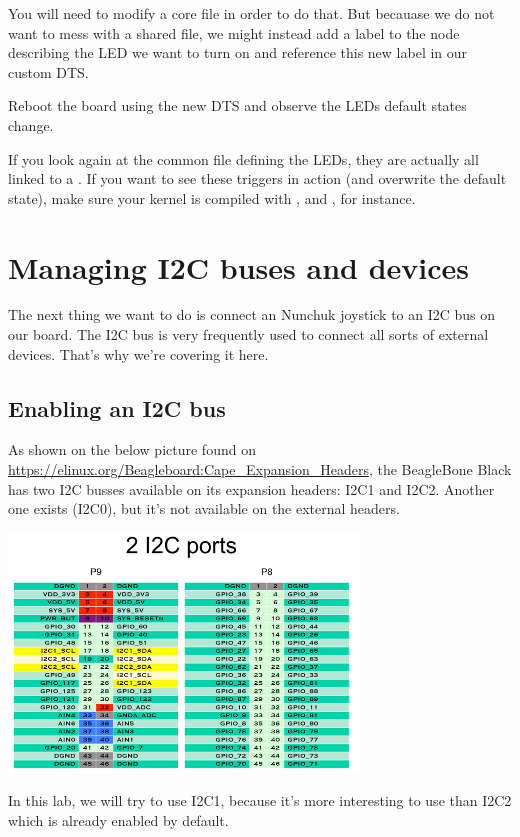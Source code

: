 You will need to modify a core file in order to do that. But becauase we
do not want to mess with a shared file, we might instead add a label to
the node describing the LED we want to turn on and reference this new
label in our custom DTS.

Reboot the board using the new DTS and observe the LEDs default states
change.

If you look again at the common file defining the LEDs, they are
actually all linked to a . If you want to
see these triggers in action (and overwrite the default state), make
sure your kernel is compiled with ,
 and
, for instance.

\section{Managing I2C buses and devices}

The next thing we want to do is connect an Nunchuk joystick
to an I2C bus on our board. The I2C bus is very frequently used
to connect all sorts of external devices. That's why we're covering
it here.

\subsection{Enabling an I2C bus}

As shown on the below picture found on
\url{https://elinux.org/Beagleboard:Cape_Expansion_Headers}, the
BeagleBone Black has two I2C busses available on its expansion headers:
I2C1 and I2C2. Another one exists (I2C0), but it's not
available on the external headers.

\includegraphics[width=0.7\textwidth]{labs/kernel-i2c-describing-hardware/bbb-i2c.png}

In this lab, we will try to use I2C1, because it's more interesting to
use than I2C2 which is already enabled by default.

